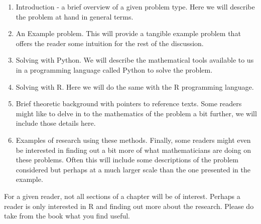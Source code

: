 \begin{enumerate}
\item
  Introduction - a brief overview of a given problem type. Here we will
  describe the problem at hand in general terms.
\item
  An Example problem. This will provide a tangible example problem that
  offers the reader some intuition for the rest of the discussion.
\item
  Solving with Python. We will describe the mathematical tools available
  to us in a programming language called Python to solve the problem.
\item
  Solving with R. Here we will do the same with the R programming
  language.
\item
  Brief theoretic background with pointers to reference texts. Some
  readers might like to delve in to the mathematics of the problem a bit
  further, we will include those details here.
\item
  Examples of research using these methods. Finally, some readers might
  even be interested in finding out a bit more of what mathematicians
  are doing on these problems. Often this will include some descriptions
  of the problem considered but perhaps at a much larger scale than the
  one presented in the example.
\end{enumerate}

For a given reader, not all sections of a chapter will be of interest.
Perhaps a reader is only interested in R and finding out more about the
research. Please do take from the book what you find useful.
